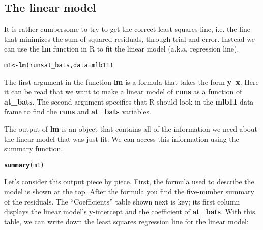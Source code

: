 \documentclass{article}\usepackage[]{graphicx}\usepackage[]{color}
\makeatletter
\newcommand{\hlopt}[1]{\textcolor[rgb]{0,0,0}{#1}}%
\newcommand{\hlstd}[1]{\textcolor[rgb]{0.345,0.345,0.345}{#1}}%
\newcommand{\hlkwb}[1]{\textcolor[rgb]{0.69,0.353,0.396}{#1}}%
\newcommand{\hlkwc}[1]{\textcolor[rgb]{0.333,0.667,0.333}{#1}}%
\newcommand{\hlkwd}[1]{\textcolor[rgb]{0.737,0.353,0.396}{\textbf{#1}}}%
\newenvironment{kframe}{%
 \def\at@end@of@kframe{}%
 \ifinner\ifhmode%
  \def\at@end@of@kframe{\end{minipage}}%
  \begin{minipage}{\columnwidth}%
 \fi\fi%
 \def\FrameCommand##1{\hskip\@totalleftmargin \hskip-\fboxsep
 \colorbox{shadecolor}{##1}\hskip-\fboxsep
     \hskip-\linewidth \hskip-\@totalleftmargin \hskip\columnwidth}%
 \MakeFramed {\advance\hsize-\width
   \@totalleftmargin\z@ \linewidth\hsize
   \@setminipage}}%
 {\par\unskip\endMakeFramed%
 \at@end@of@kframe}
\newenvironment{knitrout}{}{} %
\makeatother
\begin{document}
\subsection*{The linear model}

It is rather cumbersome to try to get the correct least squares line, i.e. the line that minimizes the sum of squared residuals, through trial and error. Instead we can use the \hlkwd{lm} function in R to fit the linear model (a.k.a. regression line).

\begin{knitrout}
\color{fgcolor}\begin{kframe}
\begin{alltt}
\hlstd{m1} \hlkwb{<-} \hlkwd{lm}\hlstd{(runs} \hlopt{\mytilde} \hlstd{at_bats,} \hlkwc{data} \hlstd{= mlb11)}
\end{alltt}
\end{kframe}
\end{knitrout}


The first argument in the function \hlkwd{lm} is a formula that takes the form \hlkwd{y}\hlkwd{\texttildelow~}\hlkwd{x}.  Here it can be read that we want to make a linear model of \hlkwd{runs} as a function of \hlkwd{at\_bats}.  The second argument specifies that R should look in the \hlkwd{mlb11} data frame to find the \hlkwd{runs} and \hlkwd{at\_bats} variables.

The output of \hlkwd{lm} is an object that contains all of the information we need about the linear model that was just fit.  We can access this information using the summary function.

\begin{knitrout}
\color{fgcolor}\begin{kframe}
\begin{alltt}
\hlkwd{summary}\hlstd{(m1)}
\end{alltt}
\end{kframe}
\end{knitrout}


Let's consider this output piece by piece.  First, the formula used to describe the model is shown at the top. After the formula you find the five-number summary of the residuals. The ``Coefficients'' table shown next is key; its first column displays the linear model's y-intercept and the coefficient of \hlkwd{at\_bats}. With this table, we can write down the least squares regression line for the linear model:
\end{document}
